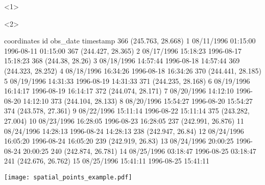 \begin{frame}[t,fragile]{\subsecname}{\subsubsecname}
\begin{overlayarea}{\textwidth}{\textheight}
\begin{onlyenv}<1>
\begin{minipage}{\textwidth}
\end{minipage}
\end{onlyenv}

\begin{onlyenv}<2>
\begin{minipage}{\textwidth}
\begin{rcode}
          coordinates id            obs_date           timestamp
366 (245.763, 28.668)  1 08/11/1996 01:15:00 1996-08-11 01:15:00
367 (244.427, 28.365)  2 08/17/1996 15:18:23 1996-08-17 15:18:23
368   (244.38, 28.26)  3 08/18/1996 14:57:44 1996-08-18 14:57:44
369 (244.323, 28.252)  4 08/18/1996 16:34:26 1996-08-18 16:34:26
370 (244.441, 28.185)  5 08/19/1996 14:31:33 1996-08-19 14:31:33
371 (244.235, 28.168)  6 08/19/1996 16:14:17 1996-08-19 16:14:17
372 (244.074, 28.171)  7 08/20/1996 14:12:10 1996-08-20 14:12:10
373 (244.104, 28.133)  8 08/20/1996 15:54:27 1996-08-20 15:54:27
374 (243.578, 27.361)  9 08/22/1996 15:11:14 1996-08-22 15:11:14
375 (243.282, 27.004) 10 08/23/1996 16:28:05 1996-08-23 16:28:05
237 (242.991, 26.876) 11 08/24/1996 14:28:13 1996-08-24 14:28:13
238  (242.947, 26.84) 12 08/24/1996 16:05:20 1996-08-24 16:05:20
239  (242.919, 26.83) 13 08/24/1996 20:00:25 1996-08-24 20:00:25
240 (242.874, 26.781) 14 08/25/1996 03:18:47 1996-08-25 03:18:47
241 (242.676, 26.762) 15 08/25/1996 15:41:11 1996-08-25 15:41:11
\end{rcode}
\end{minipage}
\end{onlyenv}

\begin{minipage}{\textwidth}
\centering
\texttt{[image: spatial\_points\_example.pdf]}
\end{minipage}
\end{overlayarea}
\end{frame}

